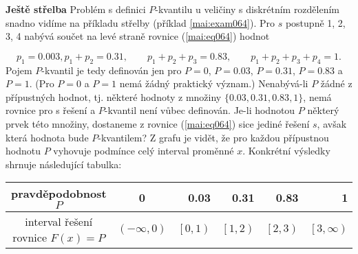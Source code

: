 \wikitextrule
\begin{example}\label{mai:exam067}
  \textbf{Ještě střelba}\newline\small
  Problém s definici \(P\)-kvantilu u veličiny s diskrétním rozdělením snadno vidíme na příkladu 
  střelby (příklad \ref{mai:exam064}). Pro \(s\) postupně 1, 2, 3, 4 nabývá součet na levé straně 
  rovnice (\ref{mai:eq064}) hodnot
  
  \begin{equation*}
    p_1 = \num{0.003}, p_1 + p_2 = \num{0.31},\qquad p_1 + p_2 + p_3 = \num{0.83},\qquad 
    p_1 + p_2 + p_3 + p_4 = 1.
  \end{equation*}
  Pojem \(P\)-kvantil je tedy definován jen pro \(P = 0\), \(P = \num{0.03}\), \(P = \num{0.31}\), 
  \(P = \num{0.83}\) a \(P = 1\). (Pro \(P = 0\) a \(P = 1\) nemá žádný praktický význam.) 
  Nenabývá-li \(P\) žádné z přípustných hodnot, tj. některé hodnoty z množiny \(\{\num{0.03}, 
  \num{0.31}, \num{0.83}, 1\}\), nemá rovnice pro s řešení a \(P\)-kvantil není vůbec definován. 
  Je-li hodnotou \(P\) některý prvek této množiny, dostaneme z rovnice (\ref{mai:eq064}) sice 
  jediné řešení \(s\), avšak která hodnota bude \(P\)-kvantilem? Z grafu je vidět, že pro každou 
  přípustnou hodnotu \(P\) vyhovuje podmínce celý interval proměnné \(x\). Konkrétní výsledky 
  shrnuje následující tabulka:
  
  \begin{table}[h]
    \centering
    \begin{tabular}{c|crrrr}
      pravděpodobnost \(P\)  & \num{0} & \num{0.03} &  \num{0.31} &  \num{0.83} & \num{1}  \\ \hline
      interval řešení rovnice \(F(x) = P\) & \((-\infty,\num{0})\) & \(\left[0, 1\right)\) & 
      \(\left[1, 2\right)\) & \(\left[2, 3\right)\) & \(\left[3, \infty\right)\)
    \end{tabular}
  \end{table}
  

\end{example}
